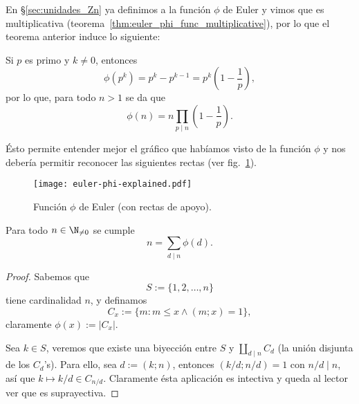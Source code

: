 \documentclass[teoria-numeros.tex]{subfiles}
\begin{document}

En \S\ref{sec:unidades_Zn} ya definimos a la función $\phi$ de Euler y vimos que es multiplicativa (teorema~\ref{thm:euler_phi_func_multiplicative}),
por lo que el teorema anterior induce lo siguiente:
\begin{prop}
	Si $p$ es primo y $k \ne 0$, entonces
	$$ \phi(p^k) = p^k - p^{k-1} = p^k\left(1 - \frac{1}{p}\right), $$
	por lo que, para todo $n > 1$ se da que
	$$ \phi(n) = n\prod_{p \mid n}\left( 1 - \frac{1}{p} \right). $$
\end{prop}
Ésto permite entender mejor el gráfico que habíamos visto de la función $\phi$ y nos debería permitir reconocer las siguientes rectas
(ver fig.~\ref{fig:euler-phi-explained}).
\begin{figure}[!hbt]
	\centering
	\texttt{[image: euler-phi-explained.pdf]}
	\caption{Función $\phi$ de Euler (con rectas de apoyo).}%
	\label{fig:euler-phi-explained}
\end{figure}

\begin{prop}
	Para todo $n\in\N_{\ne 0}$ se cumple
	$$ n = \sum_{d \mid n} \phi(d). $$
\end{prop}
\begin{proof}
	Sabemos que
	$$ S := \{1, 2, \dots, n\} $$
	tiene cardinalidad $n$, y definamos
	$$ C_x := \{ m : m\le x \wedge (m; x) = 1 \}, $$
	claramente $\phi(x) := |C_x|$.
	\par
	Sea $k \in S$, veremos que existe una biyección entre $S$ y $\coprod_{d\mid n} C_d$ (la unión disjunta de los $C_d$'s).
	Para ello, sea $d := (k; n)$, entonces $(k/d; n/d) = 1$ con $n/d \mid n$, así que $k \mapsto k/d \in C_{n/d}$.
	Claramente ésta aplicación es intectiva y queda al lector ver que es suprayectiva.
\end{proof}
\end{document}
